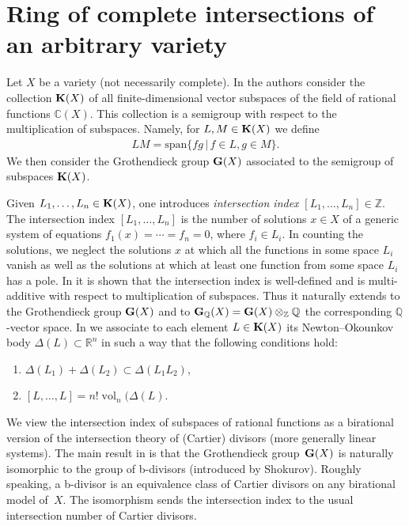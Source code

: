 \documentclass[pdftex]{sigma}
\def \C{\mathbb{C}}
\def \Z{\mathbb{Z}}
\def \R{\mathbb{R}}
\def \Q{\mathbb{Q}}
\def \K{{\bf K}}
\def \G{{\bf G}}
\def \vol{\operatorname{vol}}
\numberwithin{equation}{section}
\theoremstyle{definition}
\begin{document}
\section{Ring of complete intersections of an arbitrary variety}\label{sec-ring-complete-intersec-general}

Let $X$ be a variety (not necessarily complete). In \cite{KKh-MMJ, KKh-CMB} the authors consider the collection $\K(X)$ of all finite-dimensional vector subspaces of the field of rational functions $\C(X)$. This collection is a semigroup with respect to the multiplication of subspaces. Namely, for $L, M \in \K(X)$ we define
\begin{gather*} LM = \text{span}\{fg \,|\, f \in L, g \in M\}.\end{gather*}
We then consider the Grothendieck group $\G(X)$ associated to the semigroup of subspaces $\K(X)$.

Given $L_1, \ldots, L_n \in \K(X)$, one introduces {\it intersection index} $[L_1, \ldots, L_n] \in \Z$.
The intersection index $[L_1, \ldots , L_n]$ is the number of solutions $x \in X$ of a generic system of equations $f_1(x) = \cdots = f_n = 0$, where $f_i \in L_i$. In counting the solutions, we neglect the solutions $x$ at which all the functions in some space $L_i$ vanish as well as the solutions at which at least one function from some space $L_i$ has a pole. In \cite{KKh-MMJ, KKh-CMB} it is shown that the intersection index is well-defined and is multi-additive with respect to multiplication of subspaces. Thus it naturally extends to the Grothendieck group $\G(X)$ and to $\G_\Q(X) = \G(X) \otimes_\Z \Q$ the corresponding $\Q$-vector space. In \cite[Section~4.3]{KKh-Annals} we associate to each element $L\in \K(X)$ its Newton--Okounkov body $\Delta(L) \subset \R^n$ in such a way that the following conditions hold:
\begin{enumerate}\itemsep=0pt
\item[1)] $\Delta (L_1)+\Delta (L_2) \subset \Delta (L_1 L_2)$,
\item[2)] $[L,\dots,L]=n! \vol_n(\Delta(L)$.
\end{enumerate}

We view the intersection index of subspaces of rational functions as a birational version of the intersection theory of (Cartier) divisors (more generally linear systems).
The main result in \cite{KKh-CMB} is that the Grothendieck group~$\G(X)$ is naturally isomorphic to the group of b-divisors (introduced by Shokurov). Roughly speaking, a b-divisor is an equivalence class of Cartier divisors on any birational model of~$X$. The isomorphism sends the intersection index to the usual intersection number of Cartier divisors.
\end{document}
